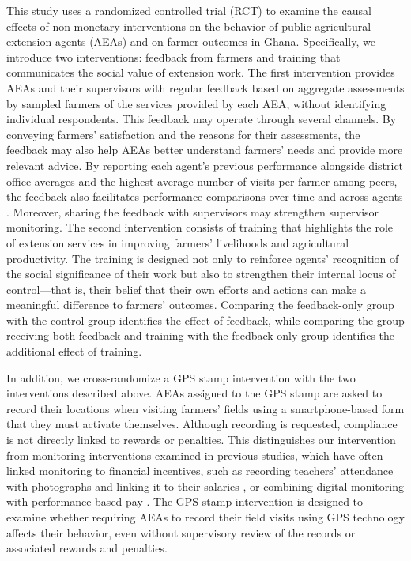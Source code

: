 \documentclass[11pt]{article}
\begin{document}
This study uses a randomized controlled trial (RCT) to examine the causal effects of non-monetary interventions on the behavior of public agricultural extension agents (AEAs) and on farmer outcomes in Ghana. Specifically, we introduce two interventions: feedback from farmers and training that communicates the social value of extension work. The first intervention provides AEAs and their supervisors with regular feedback based on aggregate assessments by sampled farmers of the services provided by each AEA, without identifying individual respondents. This feedback may operate through several channels. By conveying farmers' satisfaction and the reasons for their assessments, the feedback may also help AEAs better understand farmers' needs and provide more relevant advice. By reporting each agent's previous performance alongside district office averages and the highest average number of visits per farmer among peers, the feedback also facilitates performance comparisons over time and across agents \citep{Blanes2011, Ashraf2014}. Moreover, sharing the feedback with supervisors may strengthen supervisor monitoring. The second intervention consists of training that highlights the role of extension services in improving farmers' livelihoods and agricultural productivity. The training is designed not only to reinforce agents' recognition of the social significance of their work but also to strengthen their internal locus of control---that is, their belief that their own efforts and actions can make a meaningful difference to farmers' outcomes. Comparing the feedback-only group with the control group identifies the effect of feedback, while comparing the group receiving both feedback and training with the feedback-only group identifies the additional effect of training.

In addition, we cross-randomize a GPS stamp intervention with the two interventions described above. AEAs assigned to the GPS stamp are asked to record their locations when visiting farmers' fields using a smartphone-based form that they must activate themselves. Although recording is requested, compliance is not directly linked to rewards or penalties. This distinguishes our intervention from monitoring interventions examined in previous studies, which have often linked monitoring to financial incentives, such as recording teachers' attendance with photographs and linking it to their salaries \citep{Duflo2012}, or combining digital monitoring with performance-based pay \citep{Genicot2022}. The GPS stamp intervention is designed to examine whether requiring AEAs to record their field visits using GPS technology affects their behavior, even without supervisory review of the records or associated rewards and penalties.
\end{document}
